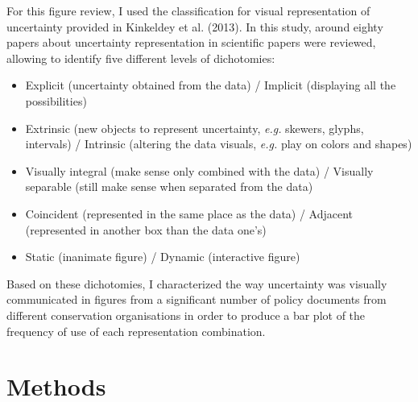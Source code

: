 \documentclass[12pt,a4paper]{article}
\begin{document}
For this figure review, I used the classification for visual representation of uncertainty provided in Kinkeldey et al. (2013).
In this study, around eighty papers about uncertainty representation in scientific papers were reviewed, allowing to identify five different levels of dichotomies:
\begin{itemize}
\item Explicit (uncertainty obtained from the data) / Implicit (displaying all the possibilities)
\item Extrinsic (new objects to represent uncertainty, \textit{e.g.} skewers, glyphs, intervals) / Intrinsic (altering the data visuals, \textit{e.g.} play on colors and shapes)
\item Visually integral (make sense only combined with the data) / Visually separable (still make sense when  separated from the data)
\item Coincident (represented in the same place as the data) / Adjacent (represented in another box than the data one's)
\item Static (inanimate figure) / Dynamic (interactive figure)
\end{itemize}
Based on these dichotomies, I characterized the way uncertainty was visually communicated in figures from a significant number of policy documents from different conservation organisations in order to produce a bar plot of the frequency of use of each representation combination.

\section{Methods}
\end{document}
